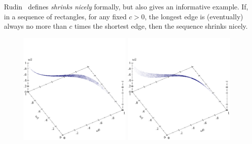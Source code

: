 Rudin~\cite{cit:rudin-1987book-analysis} defines \emph{shrinks nicely} formally, but also gives an informative example.
If, in a sequence of rectangles, for any fixed $c > 0$, the longest edge is (eventually) always no more than $c$ times the shortest edge, then the sequence shrinks nicely.

\renewcommand{\subfigurewidth}{2.15in}
\begin{figure}[tb!]\centering%
\includegraphics[width=\subfigurewidth]{results/normal-normals-wide1-points}%
\includegraphics[width=\subfigurewidth]{results/normal-normals-wide2-points}%

\end{figure}
